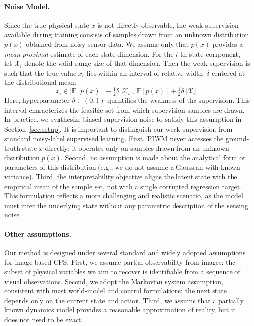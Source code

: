 \documentclass[nonacm,sigconf]{acmart}
\begin{document}
\paragraph{Noise Model.}
Since the true physical state $x$ is not directly observable, the weak supervision available during training consists of samples drawn from an unknown distribution $p(x)$ obtained from noisy sensor data.
We assume only that $p(x)$ provides a \emph{mean-proximal} estimate of each state dimension. 
For the $i$-th state component, let $\mathcal{X}_i$ denote the valid range size of that dimension. Then the weak supervision is such that the true value $x_i$ lies within an  interval of relative width~$\delta$ centered at the distributional mean:
\[
x_i \in 
\Big[
\mathbb{E}[p(x)] - \tfrac{1}{2}\delta\,|\mathcal{X}_i|,\;
\mathbb{E}[p(x)] + \tfrac{1}{2}\delta\,|\mathcal{X}_i|
\Big]
\]
Here, hyperparameter $\delta\in(0,1)$ quantifies the weakness of the supervision.  
This interval characterizes the feasible set from which supervision samples are drawn. In practice, we synthesize biased supervision noise to satisfy this assumption in Section~\ref{sec:setup}. It is important to distinguish our weak supervision from standard noisy-label supervised learning. First, PIWM never accesses the ground-truth state $x$ directly; it operates only on samples drawn from an unknown distribution $p(x)$. Second, no assumption is made about the analytical form or parameters of this distribution (e.g., we do not assume a Gaussian with known variance). Third, the interpretability objective aligns the latent state with the empirical mean of the sample set, not with a single corrupted regression target. This formulation reflects a more challenging and realistic scenario, as the model must infer the underlying state without any parametric description of the sensing noise.



\paragraph{Other assumptions.} 
Our method is designed under several standard and widely adopted assumptions for image-based CPS. First, we assume partial observability from images: the subset of physical variables we aim to recover is identifiable from a sequence of visual observations. Second, we adopt the Markovian system assumption, consistent with most world-model and control formulations: the next state depends only on the current state and action. Third, we assume that a partially known dynamics model provides a reasonable approximation of reality, but it does not need to be exact.
\end{document}

